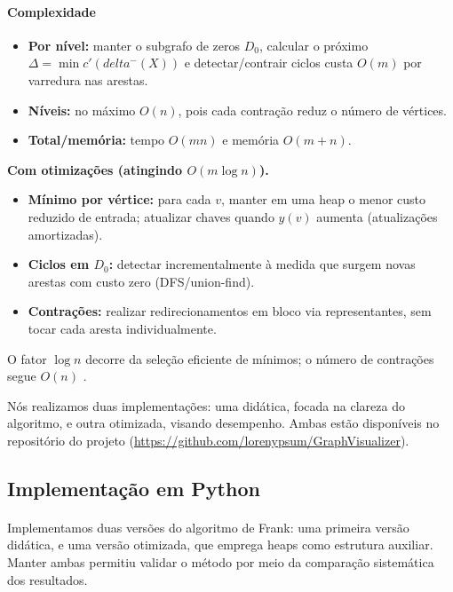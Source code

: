 \documentclass[12pt,a4paper]{article}
\def\emph#1{#1}%
\def\delta{delta}%
\begin{document}
\paragraph{Complexidade}

\begin{itemize}\setlength{\itemsep}{2pt}
    \item \textbf{Por nível:} manter o subgrafo de zeros \(D_0\), calcular o próximo \(\Delta=\min c'(\delta^-(X))\) e detectar/contrair ciclos custa \(O(m)\) por varredura nas arestas.
    \item \textbf{Níveis:} no máximo \(O(n)\), pois cada contração reduz o número de vértices.
    \item \textbf{Total/memória:} tempo \(O(mn)\) e memória \(O(m+n)\).
\end{itemize}

\textbf{Com otimizações (atingindo \(O(m\log n)\)).}
\begin{itemize}\setlength{\itemsep}{2pt}
    \item \textbf{Mínimo por vértice:} para cada \(v\), manter em uma \emph{heap} o menor custo reduzido de entrada; atualizar chaves quando \(y(v)\) aumenta (atualizações amortizadas).
    \item \textbf{Ciclos em \(D_0\):} detectar incrementalmente à medida que surgem novas arestas com custo zero (DFS/union-find).
    \item \textbf{Contrações:} realizar redirecionamentos em bloco via representantes, sem tocar cada aresta individualmente.
\end{itemize}
O fator \(\log n\) decorre da seleção eficiente de mínimos; o número de contrações segue \(O(n)\) \cite{frank2014,schrijver2003comb}.

Nós realizamos duas implementações: uma didática, focada na clareza do algoritmo, e outra otimizada, visando desempenho. Ambas estão disponíveis no repositório do projeto (\url{https://github.com/lorenypsum/GraphVisualizer}).

\subsection{Implementação em Python}

\paragraph{}
Implementamos duas versões do algoritmo de Frank: uma primeira versão didática, e uma versão otimizada, que emprega heaps como estrutura auxiliar. Manter ambas permitiu validar o método por meio da comparação sistemática dos resultados.
\end{document}
